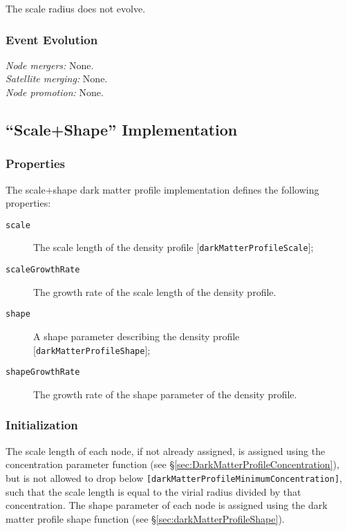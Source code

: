 The scale radius does not evolve.

\subsubsection{Event Evolution}

\noindent\emph{Node mergers:} None.\\

\noindent\emph{Satellite merging:} None.\\

\noindent\emph{Node promotion:} None.\\

\subsection{``Scale+Shape'' Implementation}\label{sec:DarkMatterProfileScaleShape}

\subsubsection{Properties}

The scale$+$shape dark matter profile implementation defines the following properties:
\begin{description}
 \item [{\tt scale}] The scale length of the density profile [{\tt darkMatterProfileScale}];
 \item [{\tt scaleGrowthRate}] The growth rate of the scale length of the density profile.
 \item [{\tt shape}] A shape parameter describing the density profile [{\tt darkMatterProfileShape}];
 \item [{\tt shapeGrowthRate}] The growth rate of the shape parameter of the density profile.
\end{description}

\subsubsection{Initialization}

The scale length of each node, if not already assigned, is assigned using the concentration parameter function (see \S\ref{sec:DarkMatterProfileConcentration}), but is not allowed to drop below {\tt [darkMatterProfileMinimumConcentration]}, such that the scale length is equal to the virial radius divided by that concentration. The shape parameter of each \gls{node} is assigned using the dark matter profile shape function (see \S\ref{sec:darkMatterProfileShape}).

